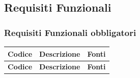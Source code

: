 \subsection{Requisiti Funzionali}

\subsubsection{Requisiti Funzionali obbligatori}
\renewcommand{\arraystretch}{1.15}
\begin{longtable}{|>{\raggedright}p{}|>{\raggedright\arraybackslash}p{}|>{\raggedright\arraybackslash}p{}|}

	\hline
	\rowcolor[gray]{0.9}
	\textbf{Codice} & \textbf{Descrizione} & \textbf{Fonti} \\
	\hline
	\endfirsthead
	
	\hline
	\rowcolor[gray]{0.9}
	\textbf{Codice} & \textbf{Descrizione} & \textbf{Fonti}  \\
	\hline
	\endhead


\end{longtable}
